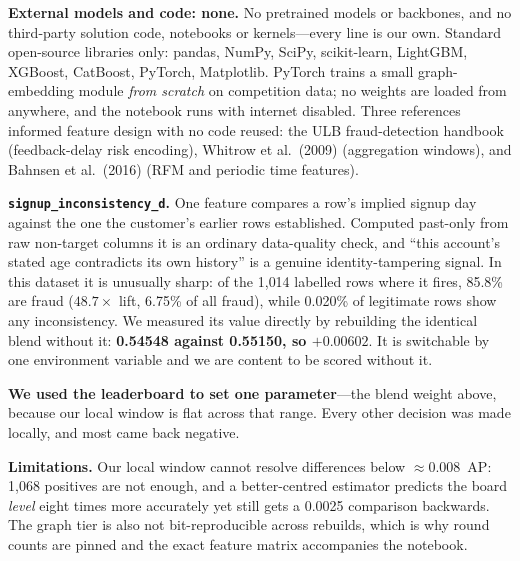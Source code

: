 \documentclass[10pt,a4paper]{article}
\begin{document}
\textbf{External models and code: none.} No pretrained models or backbones, and
no third-party solution code, notebooks or kernels---every line is our own.
Standard open-source libraries only: pandas, NumPy, SciPy, scikit-learn,
LightGBM, XGBoost, CatBoost, PyTorch, Matplotlib. PyTorch trains a small
graph-embedding module \emph{from scratch} on competition data; no weights are
loaded from anywhere, and the notebook runs with internet disabled. Three
references informed feature design with no code reused: the ULB fraud-detection
handbook (feedback-delay risk encoding), Whitrow et al.\ (2009) (aggregation
windows), and Bahnsen et al.\ (2016) (RFM and periodic time features).

\textbf{\texttt{signup\_inconsistency\_d}.} One feature compares a row's implied
signup day against the one the customer's earlier rows established. Computed
past-only from raw non-target columns it is an ordinary data-quality check, and
``this account's stated age contradicts its own history'' is a genuine
identity-tampering signal. In this dataset it is unusually sharp: of the 1{,}014
labelled rows where it fires, 85.8\% are fraud ($48.7\times$ lift, 6.75\% of all
fraud), while 0.020\% of legitimate rows show any inconsistency. We measured its
value directly by rebuilding the identical blend without it: \textbf{0.54548
against 0.55150, so $+0.00602$}. It is switchable by one environment variable and
we are content to be scored without it.

\textbf{We used the leaderboard to set one parameter}---the blend weight above,
because our local window is flat across that range. Every other decision was made
locally, and most came back negative.

\textbf{Limitations.} Our local window cannot resolve differences below
${\approx}0.008$~AP: 1{,}068 positives are not enough, and a better-centred
estimator predicts the board \emph{level} eight times more accurately yet still
gets a 0.0025 comparison backwards. The graph tier is also not bit-reproducible
across rebuilds, which is why round counts are pinned and the exact feature
matrix accompanies the notebook.
\end{document}
